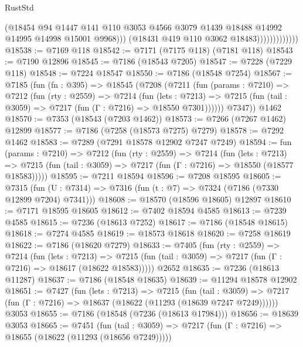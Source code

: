 \begin{lexlean}{RustStd}
\begin{coremodule}
{\begin{coremodule}
{{{{{{{{{{{{{{{{{{{{{{{{{{{{{{{{                                (@18454
                                  @94
                                  @1447
                                  @141
                                  @110
                                  @3053
                                  @4566
                                  @3079
                                  @1439
                                  @18488
                                  @14992
                                  @14995
                                  @14998
                                  @15001
                                  @9968)))
                            (@18431 @419 @110 @3062 @18483)))))))))))))
@18538 := @7169 @118
@18542 := @7171 (@7175 @118) (@7181 @118)
@18543 := @7190 @12896
@18545 := @7186 (@18543 @7205)
@18547 := @7228 (@7229 @118)
@18548 := @7224 @18547
@18550 := @7186 (@18548 @7254)
@18567 := @7185
    (fun (fn : @395) =>
    @18545
      (@7208
        (@7211
          (fun (params : @7210) =>
          @7212
            (fun (rty : @2559) =>
            @7214
              (fun (lets : @7213) =>
              @7215 (fun (tail : @3059) => @7217 (fun (Γ : @7216) => @18550 @7301))))))
        @7347))
    @1462
@18570 := @7353 (@18543 (@7203 @1462))
@18573 := @7266 (@7267 @1462) @12899
@18577 := @7186 (@7258 (@18573 @7275) @7279)
@18578 := @7292 @1462
@18583 := @7289 (@7291 @18578 @12902 @7247 @7249)
@18594 := fun (params : @7210) =>
  @7212
    (fun (rty : @2559) =>
    @7214
      (fun (lets : @7213) =>
      @7215 (fun (tail : @3059) => @7217 (fun (Γ : @7216) => @18550 (@18577 @18583)))))
@18595 := @7211 @18594
@18596 := @7208 @18595
@18605 := @7315
    (fun (U : @7314) => @7316 (fun (t : @7) => @7324 (@7186 (@7330 @12899 @7204) @7341)))
@18608 := @18570 (@18596 @18605) @12897
@18610 := @7171 @18595 @18605
@18612 := @7402 @18594 @4585
@18613 := @7239 @4585
@18615 := @7236 (@18613 @7252)
@18617 := @7186 (@18548 @18615)
@18618 := @7274 @4585
@18619 := @18573 @18618
@18620 := @7258 @18619
@18622 := @7186 (@18620 @7279)
@18633 := @7405
    (fun (rty : @2559) =>
    @7214
      (fun (lets : @7213) =>
      @7215 (fun (tail : @3059) => @7217 (fun (Γ : @7216) => @18617 (@18622 @18583)))))
    @2652
@18635 := @7236 (@18613 @11287)
@18637 := @7186 (@18548 @18635)
@18639 := @11294 @18578 @12902
@18651 := @7427
    (fun (lets : @7213) =>
    @7215
      (fun (tail : @3059) =>
      @7217 (fun (Γ : @7216) => @18637 (@18622 (@11293 (@18639 @7247 @7249))))))
    @3053
@18655 := @7186 (@18548 (@7236 (@18613 @17984)))
@18656 := @18639 @3053
@18665 := @7451
    (fun (tail : @3059) => @7217 (fun (Γ : @7216) => @18655 (@18622 (@11293 (@18656 @7249)))))
}}}}}}}}}}}}}}}}}}}}}}}}}}}}}}}}
\end{coremodule}}
\end{coremodule}
\end{lexlean}
